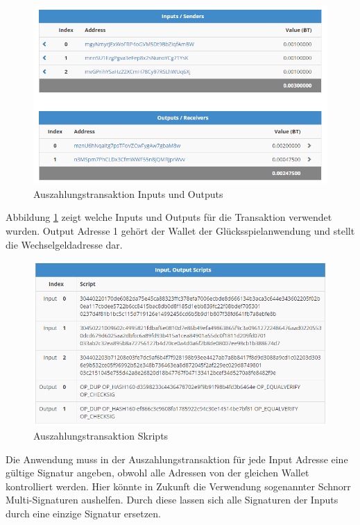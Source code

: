 \begin{figure}[H]
\centering
\includegraphics[width=1\linewidth]{Figures/btc_gui/btc_txn_input_output}
\decoRule
\caption{Auszahlungstransaktion Inputs und Outputs}
\label{fig:btc_txn_input_output}
\end{figure}


Abbildung \ref{fig:btc_txn_input_output} zeigt welche Inputs und Outputs für die Transaktion verwendet wurden. Output Adresse 1 gehört der Wallet der Glücksspielanwendung und stellt die Wechselgeldadresse dar.


\begin{figure}[H]
\centering
\includegraphics[width=1\linewidth]{Figures/btc_gui/btc_txn_input_output_scripts}
\decoRule
\caption{Auszahlungstransaktion Skripts}
\label{fig:btc_txn_input_output_scripts}
\end{figure}

Die Anwendung muss in der Auszahlungstransaktion für jede Input Adresse eine gültige Signatur angeben, obwohl alle Adressen von der gleichen Wallet kontrolliert werden. Hier könnte in Zukunft die Verwendung sogenannter Schnorr Multi-Signaturen \cite{schnorr_sig} aushelfen. Durch diese lassen sich alle Signaturen der Inputs durch eine einzige Signatur ersetzen.

